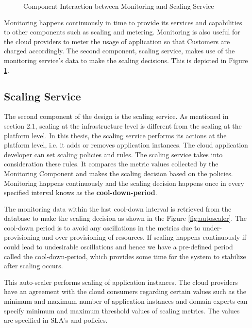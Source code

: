 \documentclass[article,type=msc,colorback,12pt,accentcolor=tud8b,table]{tudthesis}
\begin{document}
 	 	 \begin{figure}[!h]
 	 	 	\begin{center}
 	 	 		\makebox[\textwidth]{\texttt{[image: C4]}}
 	 	 	\end{center}
 	 	 	\caption{Component Interaction between Monitoring and Scaling Service}
 	 	 	\label{fig:monitor_scaling}
 	 	 \end{figure}
 	 	 
 	 	 Monitoring happens continuously in time to provide its services and capabilities to other components such as scaling and metering. Monitoring is also useful for the cloud providers to meter the usage of application so that Customers are charged accordingly. The second component, scaling service, makes use of the monitoring service's data to make the scaling decisions. This is depicted in Figure \ref{fig:monitor_scaling}.
 	
 	\subsection{Scaling Service}
 	
		The second component of the design is the scaling service. As mentioned in section 2.1, scaling at the infrastructure level is different from the scaling at the platform level. In this thesis, the scaling service performs its actions at the platform level, i.e. it adds or removes application instances. The cloud application developer can set scaling policies and rules. The scaling service takes into consideration these rules. It compares the metric values collected by the Monitoring Component and makes the scaling decision based on the policies. Monitoring happens continuously and the scaling decision happens once in every specified interval knows as the \textbf{cool-down-period}. 
		
	\par The monitoring data within the last cool-down interval is retrieved from the database to make the scaling decision as shown in the Figure \ref{fig:autoscaler}. The cool-down period is to avoid any oscillations in the metrics due to under-provisioning and over-provisioning of resources. If scaling happens continuously if could lead to undesirable oscillations and hence we have a pre-defined period called the cool-down-period, which provides some time for the system to stabilize after scaling occurs. 	
		
 	This auto-scaler performs scaling of application instances. The cloud providers have an agreement with the cloud consumers regarding certain values such as the minimum and maximum number of application instances and domain experts can specify minimum and maximum threshold values of scaling metrics. The values are specified in SLA's and policies.
 
\end{document}

